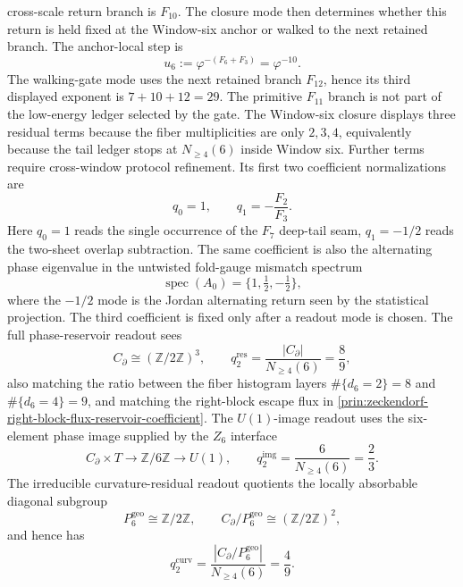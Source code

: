 \begin{principle}
cross-scale return branch is \(F_{10}\). The closure mode then determines
whether this return is held fixed at the Window-six anchor or walked to
the next retained branch. The anchor-local step is
$$
  u_6:=\varphi^{-(F_6+F_3)}=\varphi^{-10}.
$$
The walking-gate mode uses the next retained branch \(F_{12}\), hence its
third displayed exponent is \(7+10+12=29\). The primitive
\(F_{11}\) branch is not part of the low-energy ledger selected by the
gate.
The Window-six closure displays three residual terms because the fiber
multiplicities are only \(2,3,4\), equivalently because the tail ledger
stops at \(N_{\geq 4}(6)\) inside Window six. Further terms require
cross-window protocol refinement. Its first two coefficient
normalizations are
$$
  q_0=1,\qquad
  q_1=-\frac{F_2}{F_3}.
$$
Here \(q_0=1\) reads the single occurrence of the \(F_7\) deep-tail seam,
\(q_1=-1/2\) reads the two-sheet overlap subtraction. The same
coefficient is also the alternating phase eigenvalue in the untwisted
fold-gauge mismatch spectrum
$$
  \operatorname{spec}(A_0)=\{1,\tfrac12,-\tfrac12\},
$$
where the \(-1/2\) mode is the Jordan alternating return seen by the
statistical projection. The third
coefficient is fixed only after a readout mode is chosen. The full
phase-reservoir readout sees
$$
  C_\partial\cong(\mathbb{Z}/2\mathbb{Z})^3,
  \qquad
  q_2^{\mathrm{res}}=\frac{|C_\partial|}{N_{\geq4}(6)}=\frac89,
$$
also matching the ratio between the fiber histogram layers
\(\#\{d_6=2\}=8\) and \(\#\{d_6=4\}=9\), and matching the right-block
escape flux in
\autoref{prin:zeckendorf-right-block-flux-reservoir-coefficient}. The
\(U(1)\)-image readout
uses the six-element phase image supplied by the \(Z_6\) interface
$$
  C_\partial\times T\to\mathbb{Z}/6\mathbb{Z}\to U(1),
  \qquad
  q_2^{\mathrm{img}}=\frac6{N_{\geq4}(6)}=\frac23.
$$
The irreducible
curvature-residual readout quotients the locally absorbable diagonal
subgroup
$$
  P_6^{\mathrm{geo}}\cong\mathbb{Z}/2\mathbb{Z},
  \qquad
  C_\partial/P_6^{\mathrm{geo}}\cong(\mathbb{Z}/2\mathbb{Z})^2,
$$
and hence has
$$
  q_2^{\mathrm{curv}}
  =
  \frac{|C_\partial/P_6^{\mathrm{geo}}|}{N_{\geq4}(6)}
  =
  \frac49.
$$
\end{principle}

